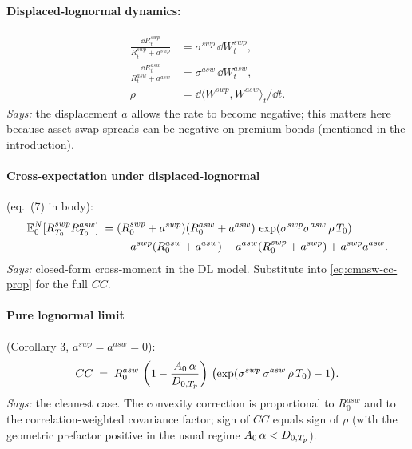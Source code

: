 \documentclass[11pt,a4paper]{article}
\begin{document}
\paragraph{Displaced-lognormal dynamics:}
\begin{align}
  \frac{\dd R^{swp}_t}{R^{swp}_t + a^{swp}} &= \sigma^{swp}\, \dd W^{swp}_t, \label{eq:cmasw-dl-swp}\\
  \frac{\dd R^{asw}_t}{R^{asw}_t + a^{asw}} &= \sigma^{asw}\, \dd W^{asw}_t, \label{eq:cmasw-dl-asw}\\
  \rho &= \dd\langle W^{swp}, W^{asw}\rangle_t / \dd t.
\end{align}
\textit{Says:} the displacement $a$ allows the rate to become
negative; this matters here because asset-swap spreads can be
negative on premium bonds (mentioned in the introduction).

\paragraph{Cross-expectation under displaced-lognormal} (eq.~(7) in body):
\begin{equation}\label{eq:cmasw-cross-exp}
  \begin{split}
    \mathbb{E}^N_0[R^{swp}_{T_0} R^{asw}_{T_0}]
    \;=\; & (R^{swp}_0 + a^{swp})(R^{asw}_0 + a^{asw})\, \exp(\sigma^{swp}\sigma^{asw}\, \rho\, T_0) \\
    & - a^{swp}(R^{asw}_0 + a^{asw}) - a^{asw}(R^{swp}_0 + a^{swp}) + a^{swp} a^{asw}.
  \end{split}
\end{equation}
\textit{Says:} closed-form cross-moment in the DL model. Substitute
into \eqref{eq:cmasw-cc-prop} for the full $CC$.

\paragraph{Pure lognormal limit} (Corollary 3, $a^{swp} = a^{asw} = 0$):
\begin{equation}\label{eq:cmasw-cc-lognormal}
  CC \;=\; R^{asw}_0\, \left(1 - \frac{A_{0}\, \alpha}{D_{0,T_p}}\right)\, \bigl( \exp(\sigma^{swp}\, \sigma^{asw}\, \rho\, T_0) - 1 \bigr).
\end{equation}
\textit{Says:} the cleanest case. The convexity correction is
proportional to $R^{asw}_0$ and to the correlation-weighted
covariance factor; sign of $CC$ equals sign of $\rho$ (with the
geometric prefactor positive in the usual regime $A_{0}\, \alpha < D_{0,T_p}$).
\end{document}
